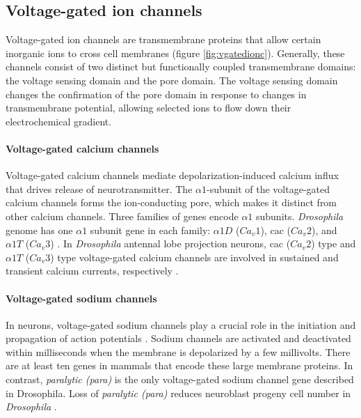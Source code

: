 \subsection{Voltage-gated ion channels}
Voltage-gated ion channels are transmembrane proteins that allow certain inorganic ions to cross cell membranes (figure  \ref{fig:vgatedionc}). Generally, these channels consist of two distinct but functionally coupled transmembrane domains: the voltage sensing domain and the pore domain. The voltage sensing domain changes the confirmation of the pore domain in response to changes in transmembrane potential, allowing selected ions to flow down their electrochemical gradient. 

\paragraph{Voltage-gated calcium channels}
Voltage-gated calcium channels mediate depolarization-induced calcium influx that drives release of neurotransmitter. The $\alpha1$-subunit of the voltage-gated calcium channels forms the ion-conducting pore, which makes it distinct from other calcium channels. Three families of genes encode $\alpha1$ subunits. \textit{Drosophila} genome has one $\alpha1$ subunit gene in each family: $\alpha1D$ ($Ca_{v}1$), cac ($Ca_{v}2$), and $\alpha1T$ ($Ca_{v}3$) \parencite{Littleton2000, King2007}. In \textit{Drosophila} antennal lobe projection neurons, cac ($Ca_{v}2$) type and $\alpha1T$ ($Ca_{v}3$) type voltage-gated calcium channels are involved in sustained and transient calcium currents, respectively \parencite{Gu2009, Iniguez2013}.

\paragraph{Voltage-gated sodium channels}
In neurons, voltage-gated sodium channels play a crucial role in the initiation and propagation of action potentials \parencite{Hodgkin1952}. Sodium channels are activated and deactivated within milliseconds when the membrane is depolarized by a few millivolts. There are at least ten genes in mammals that encode these large membrane proteins. In contrast, \textit{paralytic (para)} is the only voltage-gated sodium channel gene described in Drosophila. Loss of \textit{paralytic (para)} reduces neuroblast progeny cell number in \textit{Drosophila} \parencite{Piggott2019}.

